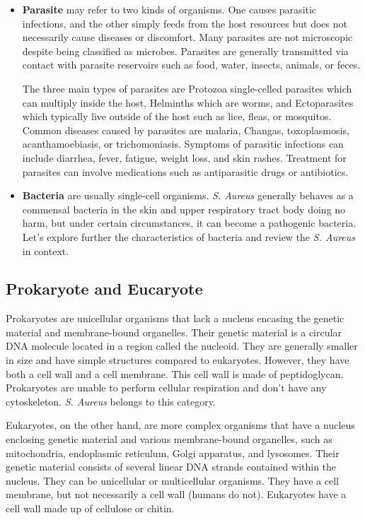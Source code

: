 \begin{itemize}
\item 
\textbf{Parasite} may refer to two kinds of organisms. One causes parasitic infections, and the other simply feeds from the host resources but does not necessarily cause diseases or discomfort. Many parasites are not microscopic despite being classified as microbes. Parasites are generally transmitted via contact with parasite reservoirs such as food, water, insects, animals, or feces.

The three main types of parasites are Protozoa single-celled parasites which can multiply inside the host, Helminths which are worms, and Ectoparasites which typically live outside of the host such as lice, fleas, or mosquitos. Common diseases caused by parasites are malaria, Changas, toxoplasmosis, acanthamoebiasis, or trichomoniasis. Symptoms of parasitic infections can include diarrhea, fever, fatigue, weight loss, and skin rashes. Treatment for parasites can involve medications such as antiparasitic drugs or antibiotics.

\item 
\textbf{Bacteria} are usually single-cell organisms. \textit{S. Aureus} generally behaves as a commensal bacteria in the skin and upper respiratory tract body doing no harm, but under certain circumstances, it can become a pathogenic bacteria. Let's explore further the characteristics of bacteria and review the \textit{S. Aureus} in context.


\end{itemize}

\subsection{Prokaryote and Eucaryote}

Prokaryotes are unicellular organisms that lack a nucleus encasing the genetic material and membrane-bound organelles. Their genetic material is a circular DNA molecule located in a region called the nucleoid. They are generally smaller in size and have simple structures compared to eukaryotes. However, they have both a cell wall and a cell membrane. This cell wall is made of peptidoglycan. Prokaryotes are unable to perform cellular respiration and don't have any cytoskeleton. \textit{S. Aureus} belongs to this category. 


Eukaryotes, on the other hand, are more complex organisms that have a nucleus enclosing genetic material and various membrane-bound organelles, such as mitochondria, endoplasmic reticulum, Golgi apparatus, and lysosomes. Their genetic material consists of several linear DNA strands contained within the nucleus. They can be unicellular or multicellular organisms. They have a cell membrane, but not necessarily a cell wall (humans do not). Eukaryotes have a cell wall made up of cellulose or chitin.


